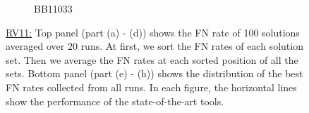 \begin{figure}[!htbp]
\begin{adjustwidth}{-1cm}{-1cm}
\begin{subfigure}{0.22\textwidth}
		\caption{BB11033}
	\end{subfigure}
	\caption{ \underline{RV11:} Top panel (part (a) - (d)) shows the FN rate of 100 solutions averaged over 20 runs. At first, we sort the FN rates of each solution set. Then we average the FN rates at each sorted position of all the sets. Bottom panel (part (e) - (h)) shows the distribution of the best FN rates collected from all runs. In each figure, the horizontal lines show the performance of the state-of-the-art tools.}
	\label{fig:rv11_fn_rate}
	\end{adjustwidth}
\end{figure}


